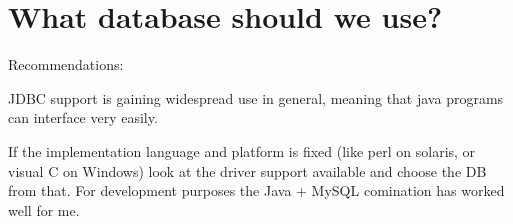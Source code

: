 \section{What database should we use?}

Recommendations:

JDBC support is gaining widespread use in general, meaning that java
programs can interface very easily.

If the implementation language and platform is fixed (like perl on
solaris, or visual C on Windows) look at the driver support available
and choose the DB from that.  For development purposes the Java +
MySQL comination has worked well for me.

